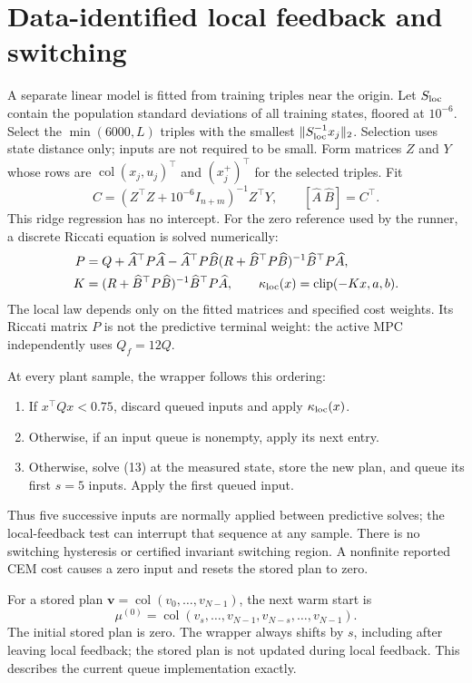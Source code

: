 \documentclass[11pt]{article}
\newcommand{\col}{\operatorname{col}}
\newcommand{\clip}{\operatorname{clip}}
\begin{document}
\section{Data-identified local feedback and switching}
A separate linear model is fitted from training triples near the origin. Let $S_{\rm loc}$ contain the population standard deviations of all training states, floored at $10^{-6}$. Select the $\min(6000,L)$ triples with the smallest $\|S_{\rm loc}^{-1}x_j\|_2$. Selection uses state distance only; inputs are not required to be small. Form matrices $Z$ and $Y$ whose rows are $\col(x_j,u_j)^\top$ and $(x_j^+)^\top$ for the selected triples. Fit
\begin{equation}\label{eq:ridge}
C=(Z^\top Z+10^{-6}I_{n+m})^{-1}Z^\top Y,\qquad [\widehat A\ \widehat B]=C^\top.
\end{equation}
This ridge regression has no intercept. For the zero reference used by the runner, a discrete Riccati equation is solved numerically:
\begin{align}
P&=Q+\widehat A^\top P\widehat A-\widehat A^\top P\widehat B(R+\widehat B^\top P\widehat B)^{-1}\widehat B^\top P\widehat A,\label{eq:dare}\\
K&=(R+\widehat B^\top P\widehat B)^{-1}\widehat B^\top P\widehat A,\qquad
\kappa_{\rm loc}(x)=\clip(-Kx,a,b).\label{eq:local}
\end{align}
The local law depends only on the fitted matrices and specified cost weights. Its Riccati matrix $P$ is not the predictive terminal weight: the active MPC independently uses $Q_f=12Q$.

At every plant sample, the wrapper follows this ordering:
\begin{enumerate}
\item If $x^\top Qx<0.75$, discard queued inputs and apply $\kappa_{\rm loc}(x)$.
\item Otherwise, if an input queue is nonempty, apply its next entry.
\item Otherwise, solve (13) at the measured state, store the new plan, and queue its first $s=5$ inputs. Apply the first queued input.
\end{enumerate}
Thus five successive inputs are normally applied between predictive solves; the local-feedback test can interrupt that sequence at any sample. There is no switching hysteresis or certified invariant switching region. A nonfinite reported CEM cost causes a zero input and resets the stored plan to zero.

For a stored plan $\mathbf v=\col(v_0,\ldots,v_{N-1})$, the next warm start is
\begin{equation}\label{eq:warmstart}
\mu^{(0)}=\col(v_s,\ldots,v_{N-1},v_{N-s},\ldots,v_{N-1}).
\end{equation}
The initial stored plan is zero. The wrapper always shifts by $s$, including after leaving local feedback; the stored plan is not updated during local feedback. This describes the current queue implementation exactly.
\end{document}
